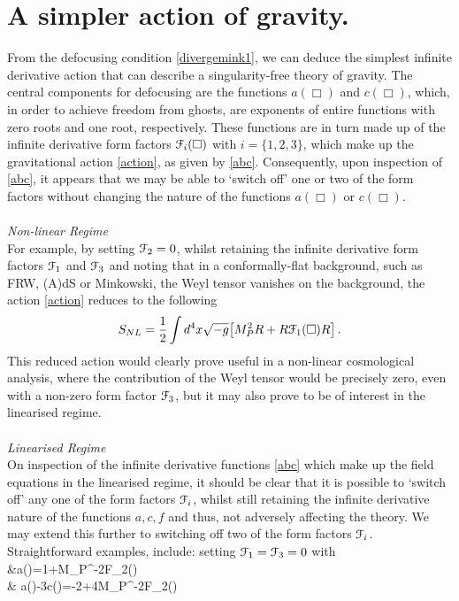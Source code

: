 \section{A simpler action of gravity.}
\label{sec:simpler}
From the defocusing condition \eqref{divergemink1}, we can deduce the simplest infinite derivative action that can describe a singularity-free theory of gravity. The central components for defocusing are the functions $a(\Box)$ and $c(\Box)$, which, in order to achieve freedom from ghosts, are exponents of entire functions with zero roots and one root, respectively. These functions are in turn made up of the infinite derivative form factors ${\cal F}_i(\Box)$ with $i=\{1,2,3\}$, which make up the gravitational action \eqref{action}, as given by \eqref{abc}. Consequently,  upon inspection of \eqref{abc}, it appears that we may be able to `switch off' one or two of the form factors without changing the  nature of the  functions $a(\Box)$ or $c(\Box)$. 
\\\\ \emph{Non-linear Regime}\\
For example, by setting ${\cal F}_2=0$, whilst retaining the infinite derivative form factors ${\cal F}_1$ and ${\cal F}_3$ and noting that
in a conformally-flat background, such as FRW, (A)dS or Minkowski, the Weyl tensor vanishes on the background, the action \eqref{action} reduces to the following
\[
\label{actionsimp}
S_{NL}=\frac{1}{2}\int d^{4}x\sqrt{-g}\bigl[M_{P}^{2}R+ R{\cal F}_{1}(\Box)R\bigr]\,.
\]
This reduced action would clearly prove useful in a non-linear cosmological analysis, where the contribution of the Weyl tensor would be precisely zero, even with a non-zero form factor ${\cal F}_3$, but it may also prove to be of interest in the linearised regime.
\\\\\emph{Linearised Regime}\\
On inspection of the infinite derivative functions \eqref{abc} which make up the field equations in the linearised regime, it should be clear that it is possible to `switch off' any one of the form factors ${\cal F}_i$, whilst still retaining the infinite derivative nature of the functions $a,c,f$ and thus, not adversely affecting the theory. We may extend this further to switching off two of the form factors ${\cal F}_i$. Straightforward examples, include: setting ${\cal F}_1={\cal F}_3=0$ with
\ba
&a(\Box)=1+M_{P}^{-2}{\cal F}_{2}(\Box)\square\nn\\&
a(\Box)-3c(\Box)=-2+4M_{P}^{-2}{\cal F}_{2}(\Box)\square
